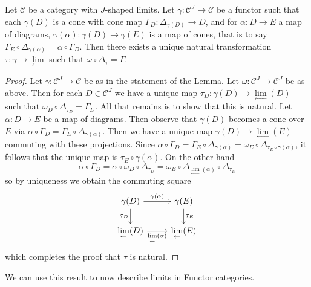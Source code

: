 \begin{lem}[label=lem:limFuncIsLim]
    Let $\mathcal{C}$ be a category with $J$-shaped limits. Let $\gamma:\mathcal{C}^J\to \mathcal{C}$ be a functor such that each $\gamma(D)$ is a cone with cone map $\Gamma_D:\Delta_{\gamma(D)}\to D$, and for $\alpha:D\to E$ a map of diagrams, $\gamma(\alpha):\gamma(D)\to \gamma(E)$ is a map of cones, that is to say $\Gamma_E\circ \Delta_{\gamma(\alpha)} = \alpha \circ \Gamma_D$. Then there exists a unique natural transformation $\tau:\gamma\to \lim\limits_{\leftarrow}$ such that $\omega\circ \Delta_{\tau} = \Gamma$.
\end{lem}
\begin{proof}
    Let $\gamma:\mathcal{C}^J\to \mathcal{C}$ be as in the statement of the Lemma. Let $\omega:\mathcal{C}^J\to \mathcal{C}^J$ be as above. Then for each $D \in \mathcal{C}^J$ we have a unique map $\tau_D:\gamma(D)\to \lim\limits_{\leftarrow}(D)$ such that $\omega_D\circ \Delta_{\tau_D} = \Gamma_D$. All that remains is to show that this is natural. Let $\alpha:D\to E$ be a map of diagrams. Then observe that $\gamma(D)$ becomes a cone over $E$ via $\alpha\circ \Gamma_D = \Gamma_E\circ \Delta_{\gamma(\alpha)}$. Then we have a unique map $\gamma(D)\to \lim\limits_{\leftarrow}(E)$ commuting with these projections. Since $\alpha\circ \Gamma_D = \Gamma_E\circ \Delta_{\gamma(\alpha)} = \omega_E\circ \Delta_{\tau_E\circ \gamma(\alpha)}$, it follows that the unique map is $\tau_E\circ \gamma(\alpha)$. On the other hand
    \begin{equation*}
        \alpha\circ \Gamma_D = \alpha\circ \omega_D\circ \Delta_{\tau_D} = \omega_E\circ \Delta_{\lim\limits_{\leftarrow}(\alpha)}\circ \Delta_{\tau_D}
    \end{equation*}
    so by uniqueness we obtain the commuting square
    \[\begin{tikzcd}
        {\gamma(D)} & {\gamma(E)} \\
        {\lim\limits_{\leftarrow}(D)} & {\lim\limits_{\leftarrow}(E)}
        \arrow["{\gamma(\alpha)}", from=1-1, to=1-2]
        \arrow["{\tau_D}"', from=1-1, to=2-1]
        \arrow["{\lim\limits_{\leftarrow}(\alpha)}"', from=2-1, to=2-2]
        \arrow["{\tau_E}", from=1-2, to=2-2]
    \end{tikzcd}\]
    which completes the proof that $\tau$ is natural.
\end{proof}

We can use this result to now describe limits in Functor categories.


